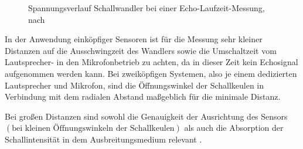 \begin{figure}[h]
    \begin{center}

        \caption{Spannungsverlauf Schallwandler bei einer Echo-Laufzeit-Messung, nach \cite{Hering:2023}}
        \label{TastbetriebELM}
    \end{center}
\end{figure}

In der Anwendung einköpfiger Sensoren ist für die Messung sehr kleiner Distanzen auf die Ausschwingzeit des Wandlers sowie die Umschaltzeit vom Lautsprecher- in den Mikrofonbetrieb zu achten, da in dieser Zeit kein Echosignal aufgenommen werden kann. Bei zweiköpfigen Systemen, also je einem dedizierten Lautsprecher und Mikrofon, sind die Öffnungswinkel der Schallkeulen in Verbindung mit dem radialen Abstand maßgeblich für die minimale Distanz.  

Bei großen Distanzen sind sowohl die Genauigkeit der Ausrichtung des Sensors $\left(\text{bei kleinen Öffnungswinkeln der Schallkeulen}\right)$ als auch die Absorption der Schallintensität in dem Ausbreitungsmedium relevant \cite{Hering:2023}. 

